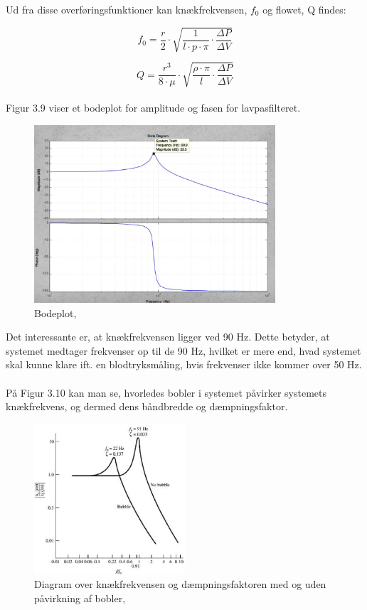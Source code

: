 Ud fra disse overføringsfunktioner kan knækfrekvensen, $f_{0}$ og flowet, Q findes:

\begin{equation}
f_{0} = \frac{r}{2} \cdot \sqrt{\frac{1}{l\cdot p \cdot \pi}\cdot \frac{\Delta P}{\Delta V}}
\end{equation}

\begin{equation}
Q = \frac{r^3}{8 \cdot \mu} \cdot \sqrt{\frac{\rho \cdot \pi}{l}\cdot \frac{\Delta P}{\Delta V}}
\end{equation}
 \\
 
Figur 3.9 viser et bodeplot for amplitude og fasen for lavpasfilteret.

\begin{figure}[H]
	\centering
	\includegraphics[width=0.8\textwidth]{Figurer/Snip20151207_61}
	\caption{Bodeplot, \protect\cite[slide 18]{Diashow}}
\end{figure}

Det interessante er, at knækfrekvensen ligger ved 90 Hz. Dette betyder, at systemet medtager frekvenser op til de 90 Hz, hvilket er mere end, hvad systemet skal kunne klare ift. en blodtryksmåling, hvis frekvenser ikke kommer over 50 Hz.
\\\\ 

På Figur 3.10 kan man se, hvorledes bobler i systemet påvirker systemets knækfrekvens, og dermed dens båndbredde og dæmpningsfaktor.   

\begin{figure}[H]
	\centering
	\includegraphics[width=0.5\textwidth]{Figurer/Snip20151207_62}
	\caption{Diagram over knækfrekvensen og dæmpningsfaktoren med og uden påvirkning af bobler, \protect\cite[s. 306]{Billed for invasiv blodtryksmaling}}
\end{figure}

